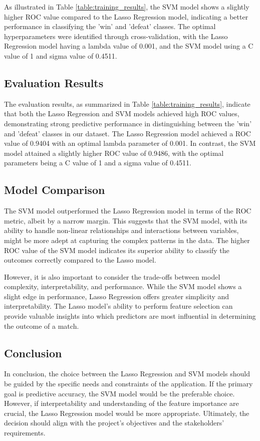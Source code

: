 \documentclass[12pt]{article}
\begin{document}
As illustrated in Table \ref{table:training_results}, the SVM model shows a slightly higher ROC value compared to the Lasso Regression model, indicating a better performance in classifying the 'win' and 'defeat' classes. The optimal hyperparameters were identified through cross-validation, with the Lasso Regression model having a lambda value of 0.001, and the SVM model using a C value of 1 and sigma value of 0.4511.

\subsection{Evaluation Results}
The evaluation results, as summarized in Table \ref{table:training_results}, indicate that both the Lasso Regression and SVM models achieved high ROC values, demonstrating strong predictive performance in distinguishing between the 'win' and 'defeat' classes in our dataset. The Lasso Regression model achieved a ROC value of 0.9404 with an optimal lambda parameter of 0.001. In contrast, the SVM model attained a slightly higher ROC value of 0.9486, with the optimal parameters being a C value of 1 and a sigma value of 0.4511.

\subsection{Model Comparison}
The SVM model outperformed the Lasso Regression model in terms of the ROC metric, albeit by a narrow margin. This suggests that the SVM model, with its ability to handle non-linear relationships and interactions between variables, might be more adept at capturing the complex patterns in the data. The higher ROC value of the SVM model indicates its superior ability to classify the outcomes correctly compared to the Lasso model.

However, it is also important to consider the trade-offs between model complexity, interpretability, and performance. While the SVM model shows a slight edge in performance, Lasso Regression offers greater simplicity and interpretability. The Lasso model's ability to perform feature selection can provide valuable insights into which predictors are most influential in determining the outcome of a match.

\subsection{Conclusion}
In conclusion, the choice between the Lasso Regression and SVM models should be guided by the specific needs and constraints of the application. If the primary goal is predictive accuracy, the SVM model would be the preferable choice. However, if interpretability and understanding of the feature importance are crucial, the Lasso Regression model would be more appropriate. Ultimately, the decision should align with the project's objectives and the stakeholders' requirements.
\end{document}
